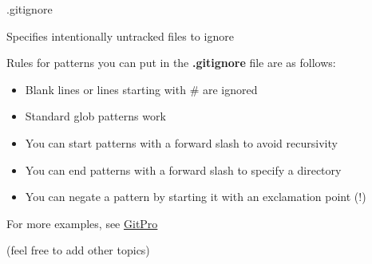 \documentclass[hyperref,compress,handout,9pt,usepdftitle=false]{beamer}
\begin{document}
\begin{frame}{.gitignore}
\begin{witemize}
\item Specifies intentionally untracked files to ignore
\item Rules for patterns you can put in the \textbf{.gitignore} file are as follows:
\begin{itemize}
	\item Blank lines or lines starting with \# are ignored
	\item Standard glob patterns work
	\item You can start patterns with a forward slash to avoid recursivity
	\item You can end patterns with a forward slash to specify a directory
	\item You can negate a pattern by starting it with an exclamation point (!)
\end{itemize}
\item For more examples, see \href{https://progit2.s3.amazonaws.com/en/2016-03-22-f3531/progit-en.1084.pdf}{GitPro}
\end{witemize}
\end{frame}

\begin{frame}{(feel free to add other topics)}
\begin{witemize}
\item  
\end{witemize}
\end{frame}
\end{document}
